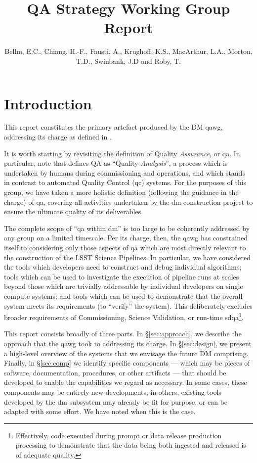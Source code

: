 \documentclass[DM,authoryear,toc,lsstdraft]{lsstdoc}
\title{QA Strategy Working Group Report}
\author{%
Bellm, E.C.,
Chiang, H.-F.,
Fausti, A.,
Krughoff, K.S.,
MacArthur, L.A.,
Morton, T.D.,
Swinbank, J.D and
Roby, T.
}
\date{\vcsDate}
\begin{document}
\maketitle

\section{Introduction}
\label{sec:intro}

This report constitutes the primary artefact produced by the DM \gls{qawg},
addressing its charge as defined in .

It is worth starting by revisiting the definition of Quality
\textit{Assurance}, or \gls{qa}.  In particular, note that 
defines QA as ``Quality \textit{Analysis}'', a process which is undertaken by
humans during commissioning and operations, and which stands in contrast to
automated Quality Control (\gls{qc}) systems. For the purposes of this group,
we have taken a more holistic definition (following the guidance in the
charge) of \gls{qa}, covering all activities undertaken by the \gls{dm}
construction project to ensure the ultimate quality of its deliverables.

The complete scope of ``\gls{qa} within \gls{dm}'' is too large to be
coherently addressed by any group on a limited timescale. Per its charge,
then, the \gls{qawg} has constrained itself to considering only those aspects
of \gls{qa} which are most directly relevant to the construction of the LSST
Science Pipelines. In particular, we have considered the tools which
developers need to construct and debug individual algorithms; tools which can
be used to investigate the execution of pipeline runs at scales beyond those
which are trivially addressable by individual developers on single compute
systems; and tools which can be used to demonstrate that the overall system
meets its requirements (to ``verify'' the system). This deliberately excludes
broader requirements of Commissioning, Science Validation, or run-time
\gls{sdqa}\footnote{Effectively, code executed during prompt or data release
production processing to demonstrate that the data being both ingested and
released is of adequate quality.}.

This report consists broadly of three parts. In \S\ref{sec:approach}, we
describe the approach that the \gls{qawg} took to addressing its charge. In
\S\ref{sec:design}, we present a high-level overview of the systems that we
envisage the future DM comprising. Finally, in \S\ref{sec:comp} we identify
specific components --- which may be pieces of software, documentation,
procedures, or other artifacts --- that should be developed to enable the
capabilities we regard as necessary. In some cases, these components may be
entirely new developments; in others, existing tools developed by the \gls{dm}
subsystem may already be fit for purpose, or can be adapted with some effort.
We have noted when this is the case.
\end{document}
